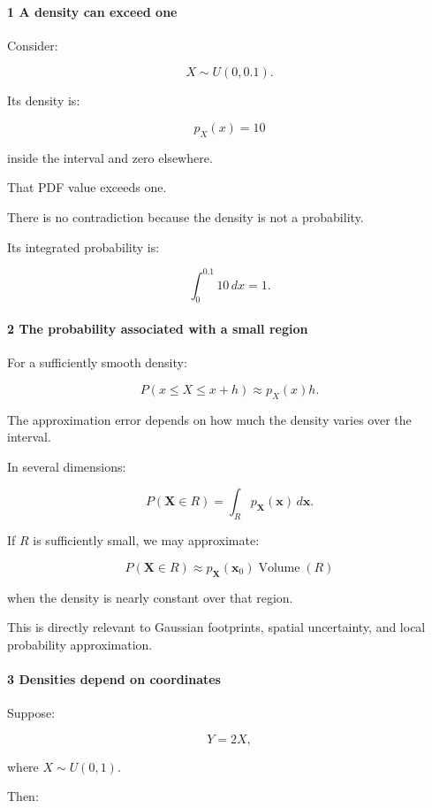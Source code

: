 \paragraph{1 A density can exceed one}\label{a-density-can-exceed-one}

Consider:

\[
 X\sim U(0,0.1).
\]

Its density is:

\[
 p_X(x)=10
\]

inside the interval and zero elsewhere.

That PDF value exceeds one.

There is no contradiction because the density is not a probability.

Its integrated probability is:

\[
 \int_0^{0.1}10\,dx=1.
\]

\paragraph{2 The probability associated with a small region}\label{the-probability-associated-with-a-small-region}

For a sufficiently smooth density:

\[
 P(x\le X\le x+h) \approx p_X(x)h.
\]

The approximation error depends on how much the density varies over the interval.

In several dimensions:

\[
 P(\mathbf X\in R) = \int_Rp_{\mathbf X}(\mathbf x)\,d\mathbf x.
\]

If \(R\) is sufficiently small, we may approximate:

\[
 P(\mathbf X\in R) \approx p_{\mathbf X}(\mathbf x_0)\operatorname{Volume}(R)
\]

when the density is nearly constant over that region.

This is directly relevant to Gaussian footprints, spatial uncertainty, and local probability approximation.

\paragraph{3 Densities depend on coordinates}\label{densities-depend-on-coordinates}

Suppose:

\[
 Y=2X,
\]

where \(X\sim U(0,1)\).

Then:

